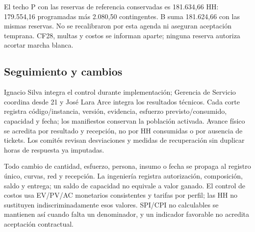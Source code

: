 El techo P con las reservas de referencia conservadas es 181.634,66 HH: 179.554,16 programadas más 2.080,50 contingentes. B suma 181.624,66 con las mismas reservas. No se recalibraron por esta agenda ni aseguran aceptación temprana. CF28, multas y costos se informan aparte; ninguna reserva autoriza acortar marcha blanca.

\subsection{Seguimiento y cambios}
Ignacio Silva integra el control durante implementación; Gerencia de Servicio coordina desde 21 y José Lara Arce integra los resultados técnicos. Cada corte registra código/instancia, versión, evidencia, esfuerzo previsto/consumido, capacidad y fecha; los manifiestos conservan la población activada. Avance físico se acredita por resultado y recepción, no por HH consumidas o por ausencia de tickets. Los comités revisan desviaciones y medidas de recuperación sin duplicar horas de respuesta ya imputadas.

Todo cambio de cantidad, esfuerzo, persona, insumo o fecha se propaga al registro único, curvas, red y recepción. La ingeniería registra autorización, composición, saldo y entrega; un saldo de capacidad no equivale a valor ganado. El control de costos usa EV/PV/AC monetarios consistentes y tarifas por perfil; las HH no sustituyen indiscriminadamente esos valores. SPI/CPI no calculables se mantienen así cuando falta un denominador, y un indicador favorable no acredita aceptación contractual.

